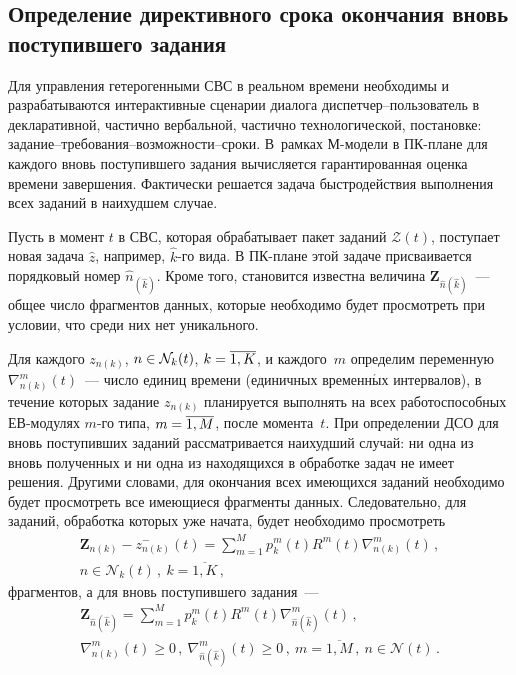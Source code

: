 \begin{multicols}{2}
\section{Определение директивного срока окончания вновь поступившего задания}

Для управления  гетерогенными СВС в реальном времени необходимы и разрабатываются интерактивные 
сценарии диалога дис\-пет\-чер--поль\-зо\-ва\-тель в декларативной, час\-тич\-но вербальной, частично 
технологической, постановке: за\-да\-ние--тре\-бо\-ва\-ния--воз\-мож\-но\-сти--сро\-ки.
В~рамках М-мо\-де\-ли в ПК-пла\-не для каж\-до\-го вновь поступившего задания вычисляется 
гарантированная оценка времени завершения. Фактически решается задача быстродействия 
выполнения всех заданий в наихудшем случае.

Пусть в момент $t$ в СВС, которая обрабатывает пакет заданий $\mathcal{Z}(t)$,  поступает новая 
задача $\hat{z}$, например, $\hat{k}$-го вида. В ПК-пла\-не этой задаче присваивается порядковый 
номер $\hat n_{(\hat{k})}$. Кроме того,  становится известна величина  
$\mathbf{Z}_{\hat n{(\hat{k})}}$~--- общее чис\-ло фрагментов данных, которые необходимо 
будет просмотреть при условии, что среди них нет уникального.

Для каж\-до\-го $z_{n(k)}$, $n \hm\in \mathcal{N}_k(t)$, $k \hm= \overline{1,K}$, и каж\-до\-го~$m$ 
определим переменную $\nabla_{n(k)}^m (t )$~---  число единиц времени (единичных временн$\acute{\mbox{ы}}$х 
интервалов), в течение которых задание     $z_{n(k)}$  планируется  выполнять на всех 
работоспособных ЕВ-мо\-ду\-лях      $m$-го типа,    $m \hm= \overline{1, M}$, после  момента~$t$. 
При определении ДСО для вновь поступивших заданий рассматривается  наихудший случай: ни одна из 
вновь полученных и ни одна из находящихся в обработке задач не имеет решения. Другими словами, 
для окончания всех имеющихся заданий необходимо будет  просмотреть все имеющиеся фрагменты данных. 
Следовательно, для заданий, обработка которых уже начата, будет необходимо просмотреть
\begin{multline*}
\mathbf{Z}_{n(k)} - z^-_{n(k)}(t) =  \sum\limits_{ m = 1}^{M} p_k^m(t) R^m(t) \nabla _{n(k)}^m (t )\,,\\
n \in \mathcal{N}_k(t)\,,\ k = \overline{1, K}\,,
\end{multline*}
фрагментов, а для вновь поступившего задания~---
\begin{multline*}
\textbf{Z}_{\hat n(\hat{k})} =  \sum\limits_{ m = 1}^{M} p_k^m(t) R^m(t)  
\nabla_{\hat n{(\hat{k})}} ^m (t )\,,  
\\
\nabla _{n(k)}^m (t ) \ge 0\,,\ \nabla _{\hat n(\hat k)} ^m (t ) \ge 0\,,\ 
m = \overline {1, M}\,,\ n \in \mathcal{N}(t)\,. 
\end{multline*}


\end{multicols}
